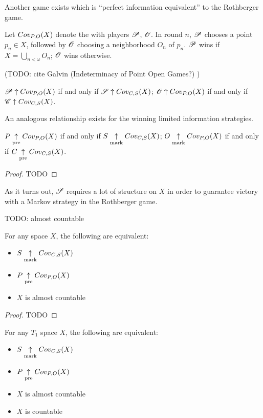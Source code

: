 Another game exists which is ``perfect information equivalent'' to the
Rothberger game.

\begin{game}
  Let $Cov_{P,O}(X)$ denote the  with
  players $\mathscr{P}$, $\mathscr{O}$. In round $n$, $\mathscr{P}$ chooses a point $p_n\in X$,
  followed by $\mathscr{O}$ choosing a neighborhood $O_n$ of $p_n$.
  $\mathscr{P}$ wins if $X=\bigcup_{n<\omega} O_n$; $\mathscr{O}$ wins otherwise.
\end{game}

(TODO: cite Galvin (Indeterminacy of Point Open Games?) )

\begin{thm}
  $\mathscr{P}\uparrow Cov_{P,O}(X)$ if and only if $\mathscr{S}\uparrow Cov_{C,S}(X)$;
  $\mathscr{O}\uparrow Cov_{P,O}(X)$ if and only if $\mathscr{C}\uparrow Cov_{C,S}(X)$.
\end{thm}

\newpage

An analogous relationship exists for the winning limited information
strategies.

\begin{thm}
  $P\underset{\text{pre}}{\uparrow}Cov_{P,O}(X)$ if and only if $S\underset{\text{mark}}{\uparrow}Cov_{C,S}(X)$;
  $O\underset{\text{mark}}{\uparrow}Cov_{P,O}(X)$ if and only if $C\underset{\text{pre}}{\uparrow}Cov_{C,S}(X)$.
\end{thm}

\begin{proof}
  TODO
\end{proof}

As it turns out, $\mathscr{S}$ requires a lot of structure on $X$ in order to
guarantee victory with a Markov strategy in the Rothberger game.

\begin{defn}
  TODO: almost countable
\end{defn}

\begin{thm}
  For any space $X$, the following are equivalent:
  \begin{itemize}
    \item $S\underset{\text{mark}}{\uparrow}Cov_{C,S}(X)$
    \item $P\underset{\text{pre}}{\uparrow}Cov_{P,O}(X)$
    \item $X$ is almost countable
  \end{itemize}
\end{thm}

\begin{proof}
  TODO
\end{proof}

\begin{thm}
  For any $T_1$ space $X$, the following are equivalent:
  \begin{itemize}
    \item $S\underset{\text{mark}}{\uparrow}Cov_{C,S}(X)$
    \item $P\underset{\text{pre}}{\uparrow}Cov_{P,O}(X)$
    \item $X$ is almost countable
    \item $X$ is countable
  \end{itemize}
\end{thm}

